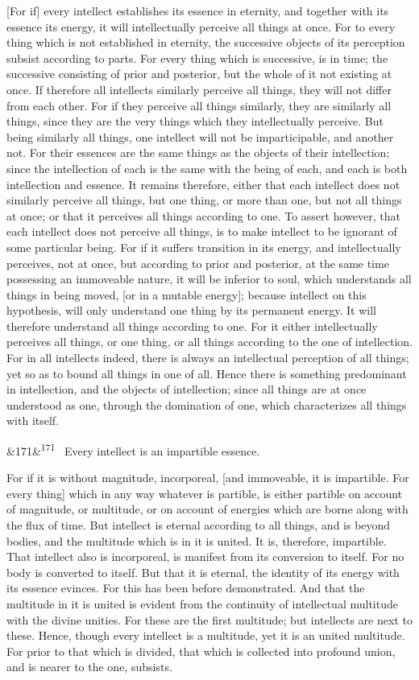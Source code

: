 \documentclass[12pt]{article}
\newcommand{\para}[1][]{\par\noindent\ifx&#1&\else\textsuperscript{\footnotesize #1}~\fi}
\begin{document}
[For if] every intellect establishes its essence in eternity, and together with its essence its energy, it will intellectually perceive all things at once. For to every thing which is not established in eternity, the successive objects of its perception subsist according to parts. For every thing which is successive, is in time; the successive consisting of prior and posterior, but the whole of it not existing at once. If therefore all intellects similarly perceive all things, they will not differ from each other. For if they perceive all things similarly, they are similarly all things, since they are the very things which they intellectually perceive. But being similarly all things, one intellect will not be imparticipable, and another not. For their essences are the same things as the objects of their intellection; since the intellection of each is the same with the being of each, and each is both intellection and essence. It remains therefore, either that each intellect does not similarly perceive all things, but one thing, or more than one, but not all things at once; or that it perceives all things according to one. To assert however, that each intellect does not perceive all things, is to make intellect to be ignorant of some particular being. For if it suffers transition in its energy, and intellectually perceives, not at once, but according to prior and posterior, at the same time possessing an immoveable nature, it will be inferior to soul, which understands all things in being moved, [or in a mutable energy]; because intellect on this hypothesis, will only understand one thing by its permanent energy. It will therefore understand all things according to one. For it either intellectually perceives all things, or one thing, or all things according to the one of intellection. For in all intellects indeed, there is always an intellectual perception of all things; yet so as to bound all things in one of all. Hence there is something predominant in intellection, and the objects of intellection; since all things are at once understood as one, through the domination of one, which characterizes all things with itself.

\para[171] Every intellect is an impartible essence.

For if it is without magnitude, incorporeal, [and immoveable, it is impartible. For every thing] which in any way whatever is partible, is either partible on account of magnitude, or multitude, or on account of energies which are borne along with the flux of time. But intellect is eternal according to all things, and is beyond bodies, and the multitude which is in it is united. It is, therefore, impartible. That intellect also is incorporeal, is manifest from its conversion to itself. For no body is converted to itself. But that it is eternal, the identity of its energy with its essence evinces. For this has been before demonstrated. And that the multitude in it is united is evident from the continuity of intellectual multitude with the divine unities. For these are the first multitude; but intellects are next to these. Hence, though every intellect is a multitude, yet it is an united multitude. For prior to that which is divided, that which is collected into profound union, and is nearer to the one, subsists.
\end{document}

